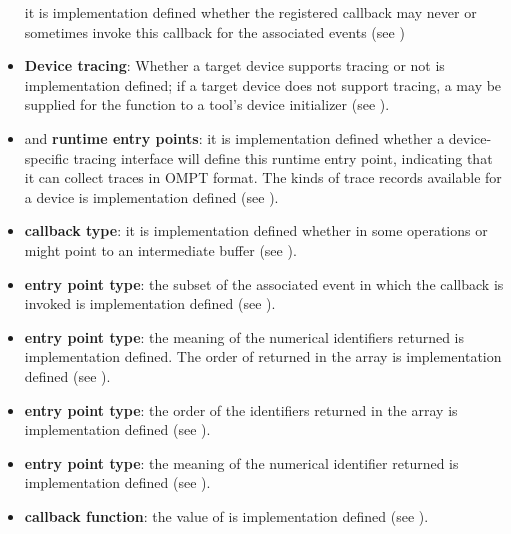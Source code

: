 \begin{itemize}
      it is implementation defined whether the registered callback may never or 
      sometimes invoke this callback for the associated events (see 
      )
\item \textbf{Device tracing}: Whether a target device supports tracing or 
      not is implementation defined; if a target device does not support tracing, 
      a  may be supplied for the  function to a tool's 
      device initializer (see ).
\item {} and  
      \textbf{runtime entry points}: it is implementation defined whether 
      a device-specific tracing interface will define this runtime entry 
      point, indicating that it can collect traces in OMPT format. The kinds 
      of trace records available for a device is implementation defined 
      (see ).
\item {} \textbf{callback type}: it is 
      implementation defined whether in some operations  or 
       might point to an intermediate buffer 
      (see ).
\item {} \textbf{entry point type}: the subset
      of the associated event in which the callback is invoked is
      implementation defined (see ).
\item {} \textbf{entry point type}: the meaning 
      of the numerical identifiers returned is implementation defined.  The 
      order of  returned in the array is implementation defined (see 
      ).
\item {} \textbf{entry point type}:
      the order of the identifiers returned in the array 
      is implementation defined (see ).
\item {} \textbf{entry point type}: the meaning of the 
      numerical identifier returned is implementation defined 
      (see ).
\item {} \textbf{callback function}:
the value of  is implementation defined (see
).


\end{itemize}
